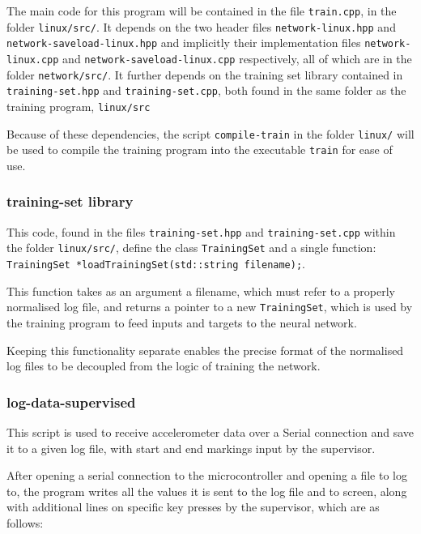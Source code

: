 \documentclass[a4paper]{article}
\begin{document}
The main code for this program will be contained in the file \lstinline{train.cpp}, in the folder \lstinline{linux/src/}. It depends on the two header files \lstinline{network-linux.hpp} and \lstinline{network-saveload-linux.hpp} and implicitly their implementation files \lstinline{network-linux.cpp} and \lstinline{network-saveload-linux.cpp} respectively, all of which are in the folder \lstinline{network/src/}. It further depends on the training set library contained in \lstinline{training-set.hpp} and \lstinline{training-set.cpp}, both found in the same folder as the training program, \lstinline{linux/src}


Because of these dependencies, the script \lstinline{compile-train} in the folder \lstinline{linux/} will be used to compile the training program into the executable \lstinline{train} for ease of use.

\subsubsection{training-set library}
\label{subsubsec:dc_csa_trainingset}

This code, found in the files \lstinline{training-set.hpp} and \lstinline{training-set.cpp} within the folder \lstinline{linux/src/}, define the class \lstinline{TrainingSet} and a single function: \lstinline{TrainingSet *loadTrainingSet(std::string filename);}.

This function takes as an argument a filename, which must refer to a properly normalised log file, and returns a pointer to a new \lstinline{TrainingSet}, which is used by the training program to feed inputs and targets to the neural network.

Keeping this functionality separate enables the precise format of the normalised log files to be decoupled from the logic of training the network.

\subsubsection{log-data-supervised}
\label{subsubsec:dc_csa_logsupervised}

This script is used to receive accelerometer data over a Serial connection and save it to a given log file, with start and end markings input by the supervisor.

After opening a serial connection to the microcontroller and opening a file to log to, the program writes all the values it is sent to the log file and to screen, along with additional lines on specific key presses by the supervisor, which are as follows:
\end{document}
